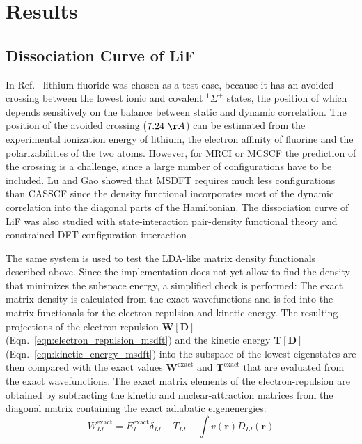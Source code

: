\documentclass[journal=jpclcd,manuscript=letter]{achemso}
\newcommand\m[1]{\mathbf{#1}}
\renewcommand\vec[1]{\mathbf{#1}}
\begin{document}
% 

\FloatBarrier

\section{Results}
\label{sec:results}

\subsection{Dissociation Curve of LiF}

In Ref.~\cite{Lu2022JPCL} lithium-fluoride was chosen as a test case, because it has an avoided crossing
between the lowest ionic and covalent $^1\Sigma^+$ states, the position of which depends sensitively on
the balance between static and dynamic correlation. The position of the avoided crossing ($7.24~\AA$) can be estimated
from the experimental ionization energy of lithium, the electron affinity of fluorine and the polarizabilities
of the two atoms. \cite{Werner1981} However, for MRCI or MCSCF the prediction of the crossing is
a challenge, since a large number of configurations have to be included. \cite{Werner1981}
Lu and Gao showed that MSDFT requires much less configurations than CASSCF since the density functional incorporates most of the
dynamic correlation into the diagonal parts of the Hamiltonian. \cite{Lu2022JPCL} The dissociation curve of
LiF was also studied with state-interaction pair-density functional theory \cite{Sand2018state}
and constrained DFT configuration interaction \cite{Wu2007configuration}.

The same system is used to test the LDA-like matrix density functionals described above. Since the implementation
does not yet allow to find the density that minimizes the subspace energy, a simplified check is performed:
The exact matrix density is calculated from the exact wavefunctions and is fed into the matrix functionals
for the electron-repulsion and kinetic energy.
The resulting projections of the electron-repulsion $\m{W}[\m{D}]$ (Eqn.~\ref{eqn:electron_repulsion_msdft})
and the kinetic energy $\m{T}[\m{D}]$ (Eqn.~\ref{eqn:kinetic_energy_msdft}) into the subspace of the lowest eigenstates are then compared with the
exact values $\m{W}^{\text{exact}}$ and $\m{T}^{\text{exact}}$ that are evaluated from the exact wavefunctions.
The exact matrix elements of the electron-repulsion are obtained by subtracting the kinetic and nuclear-attraction
matrices from the diagonal matrix containing the exact adiabatic eigenenergies:
\begin{equation}
 W^{\text{exact}}_{IJ} = E^{\text{exact}}_{I} \delta_{IJ} - T_{IJ} - \int v(\vec{r}) D_{IJ}(\vec{r})
\end{equation}
\end{document}
